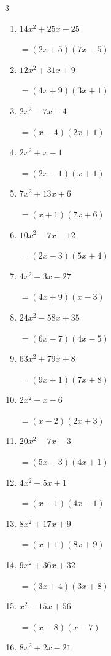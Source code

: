 \begin{multicols}{3}
\begin{enumerate}
  \item $14x^{2}+25x-25$

        $=(2x+5)(7x-5)$

  \item $12x^{2}+31x+9$

        $=(4x+9)(3x+1)$

  \item $2x^{2}-7x-4$

        $=(x-4)(2x+1)$

  \item $2x^{2}+x-1$

        $=(2x-1)(x+1)$

  \item $7x^{2}+13x+6$

        $=(x+1)(7x+6)$

  \item $10x^{2}-7x-12$

        $=(2x-3)(5x+4)$

\columnbreak %

  \item $4x^{2}-3x-27$

        $=(4x+9)(x-3)$

  \item $24x^{2}-58x+35$

        $=(6x-7)(4x-5)$

  \item $63x^{2}+79x+8$

        $=(9x+1)(7x+8)$

  \item $2x^{2}-x-6$

        $=(x-2)(2x+3)$

  \item $20x^{2}-7x-3$

        $=(5x-3)(4x+1)$

  \item $4x^{2}-5x+1$

        $=(x-1)(4x-1)$

  \item $8x^{2}+17x+9$

        $=(x+1)(8x+9)$

  \item $9x^{2}+36x+32$

        $=(3x+4)(3x+8)$

  \item $x^{2}-15x+56$

        $=(x-8)(x-7)$

  \item $8x^{2}+2x-21$


\end{enumerate}
\end{multicols}
